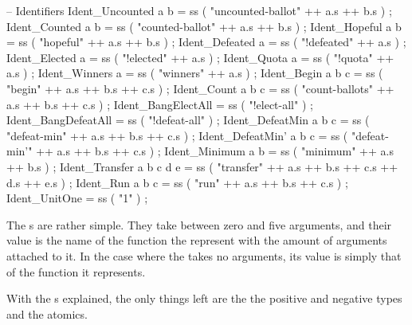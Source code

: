 \begin{lstgf}
        -- Identifiers
        Ident_Uncounted a b             = ss ( "uncounted-ballot" ++ a.s ++ b.s ) ;
        Ident_Counted a b               = ss ( "counted-ballot" ++ a.s ++ b.s ) ;
        Ident_Hopeful a b               = ss ( "hopeful" ++ a.s ++ b.s ) ;
        Ident_Defeated a                = ss ( "!defeated" ++ a.s ) ;
        Ident_Elected a                 = ss ( "!elected" ++ a.s ) ;
        Ident_Quota a                   = ss ( "!quota" ++ a.s ) ;
        Ident_Winners a                 = ss ( "winners" ++ a.s ) ;
        Ident_Begin a b c               = ss ( "begin" ++ a.s ++ b.s ++ c.s ) ;
        Ident_Count a b c               = ss ( "count-ballots" ++ a.s ++ b.s ++ c.s ) ;
        Ident_BangElectAll              = ss ( "!elect-all" ) ;
        Ident_BangDefeatAll             = ss ( "!defeat-all" ) ;
        Ident_DefeatMin a b c           = ss ( "defeat-min" ++ a.s ++ b.s ++ c.s ) ;
        Ident_DefeatMin' a b c          = ss ( "defeat-min'" ++ a.s ++ b.s ++ c.s ) ;
        Ident_Minimum a b               = ss ( "minimum" ++ a.s ++ b.s ) ;
        Ident_Transfer a b c d e        = ss ( "transfer" ++ a.s ++ b.s ++ c.s ++ d.s ++ e.s ) ;
        Ident_Run a b c                 = ss ( "run" ++ a.s ++ b.s ++ c.s ) ;
        Ident_UnitOne                   = ss ( "1" ) ;
\end{lstgf}

The s are rather simple. They take between zero and five arguments, and their value is the name of the function the represent with the amount of arguments attached to it. In the case where the  takes no arguments, its value is simply that of the function it represents.

With the s explained, the only things left are the the positive and negative types and the atomics.

